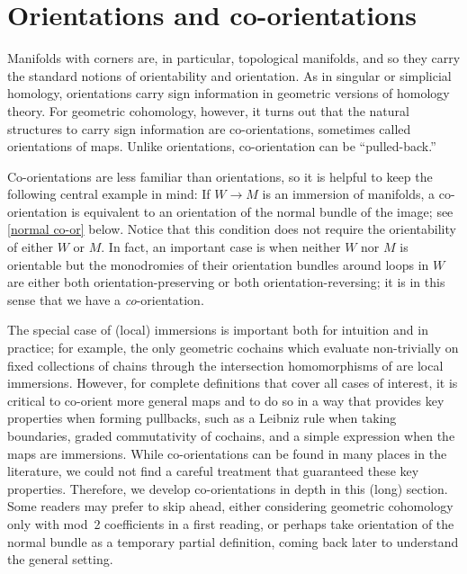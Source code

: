 
\section{Orientations and co-orientations}\label{S: orientations and co-orientations}

Manifolds with corners are, in particular, topological manifolds, and so they carry the standard notions of orientability and orientation.
As in singular or simplicial homology, orientations carry sign information in geometric versions of homology theory.
For geometric cohomology, however, it turns out that the natural structures to carry sign information are co-orientations, sometimes called orientations of maps.
Unlike orientations, co-orientation can be ``pulled-back.''

Co-orientations are less familiar than orientations, so it is helpful to keep the following central example in mind: If $W\to M$ is an immersion of manifolds, a co-orientation is equivalent to an orientation of the normal bundle of the image; see \cref{normal co-or} below.
Notice that this condition does not require the orientability of either $W$ or $M$.
In fact, an important case is when neither $W$ nor $M$ is orientable but the monodromies of their orientation bundles around loops in $W$ are either both orientation-preserving or both orientation-reversing; it is in this sense that we have a \textit{co}-orientation.

The special case of (local) immersions is important both for intuition and in practice; for example, the only geometric cochains which evaluate non-trivially on fixed collections of chains through the intersection homomorphisms of \cite{FMS-flows} are local immersions.
However, for complete definitions that cover all cases of interest, it is critical to co-orient more general maps and to do so in a way that provides key properties when forming pullbacks, such as a Leibniz rule when taking boundaries, graded commutativity of cochains, and a simple expression when the maps are immersions.
While co-orientations can be found in many places in the literature, we could not find a careful treatment that guaranteed these key properties.
Therefore, we develop co-orientations in depth in this (long) section.
Some readers may prefer to skip ahead, either considering geometric cohomology only with mod~2 coefficients in a first reading, or perhaps take orientation of the normal bundle as a temporary partial definition, coming back later to understand the general setting.

